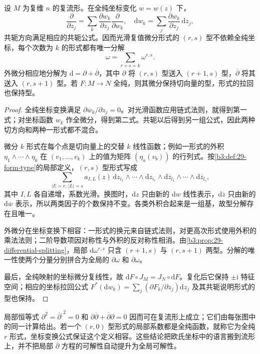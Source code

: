 \begin{proposition}[换坐标保持型]\label{b3:prop:29-type-invariance}
设 \(M\) 为复维 \(n\) 的复流形。在全纯坐标变化 \(w=w(z)\) 下，
\[
 \frac\partial{\partial z_j}
 =\sum_k\frac{\partial w_k}{\partial z_j}\frac\partial{\partial w_k},
 \quad
 \mathrm{d}w_k=\sum_j\frac{\partial w_k}{\partial z_j}\,\mathrm{d}z_j,
\]
共轭方向满足相应的共轭公式。因而光滑复值微分形式的 \((r,s)\) 型不依赖全纯坐标，每个次数为 \(k\) 的形式都有唯一分解
\[
 \omega=\sum_{r+s=k}\omega^{r,s}.
\]
外微分相应地分解为 \(\mathrm{d}=\partial+\overline\partial\)，其中 \(\partial\) 将 \((r,s)\) 型送入 \((r+1,s)\) 型，\(\overline\partial\) 将其送入 \((r,s+1)\) 型。若 \(F:M\to N\) 全纯，则其微分保持切向量的型，形式的拉回也保持型。
\end{proposition}
\begin{proof}
全纯坐标变换满足 \(\partial\overline w_k/\partial z_j=0\)。对光滑函数应用链式法则，就得到第一式；对坐标函数 \(w_k\) 作全微分，得到第二式。共轭以后得到另一组公式，因此两种切方向和两种一形式都不混合。

微分 \(k\) 形式在每个点是切向量上的交替 \(k\) 线性函数；例如一形式的外积 \(\eta_1\wedge\cdots\wedge\eta_k\) 在 \((v_1,\ldots,v_k)\) 上的值为矩阵 \((\eta_a(v_b))\) 的行列式。按\cref{b3:def:29-form-type}的局部定义，\((r,s)\) 型形式写成
\[
 \sum_{|I|=r,\,|L|=s}a_{I,L}(z)\,
 \mathrm{d}z_{i_1}\wedge\cdots\wedge\mathrm{d}z_{i_r}
 \wedge\mathrm{d}\overline z_{l_1}\wedge\cdots
 \wedge\mathrm{d}\overline z_{l_s},
\]
其中 \(I,L\) 各自递增，系数光滑。换图时，\(\mathrm{d}z\) 只由新的 \(\mathrm{d}w\) 线性表示，\(\mathrm{d}\overline z\) 只由新的 \(\mathrm{d}\overline w\) 表示，所以两类因子的个数保持不变。各类外积合起来是一组基，故型分解存在且唯一。

外微分在坐标变换下相容：一形式的换元来自链式法则，对更高次形式使用外积的乘法法则；二阶导数项因对称性与外积的反对称性相消。由\cref{b3:prop:29-differential-splitting}，局部 \(\mathrm{d}\omega^{r,s}\) 只含 \((r+1,s)\) 与 \((r,s+1)\) 两型。分解的唯一性使两个分量分别拼合为全局的 \(\partial\omega\) 和 \(\overline\partial\omega\)。

最后，全纯映射的坐标微分复线性，故 \(\mathrm{d}F\circ J_M=J_N\circ\mathrm{d}F\)。复化后它保持 \(\pm\mathrm{i}\) 特征空间；相应的坐标拉回公式 \(F^*(\mathrm{d}w_k)=\sum_j(\partial F_k/\partial z_j)\mathrm{d}z_j\) 及其共轭说明形式的型也保持。
\end{proof}

局部恒等式 \(\partial^2=\overline\partial^{,2}=0\) 和 \(\partial\overline\partial+\overline\partial\partial=0\) 因而可在复流形上成立；它们由每张图中的同一计算给出。若一个 \((r,0)\) 型形式的局部系数都是全纯函数，就称它为全纯 \(r\) 形式，坐标变换公式保证这个定义相容。这些结论把欧氏坐标中的语言搬到流形上，并不把局部 \(\overline\partial\) 方程的可解性自动提升为全局可解性。

